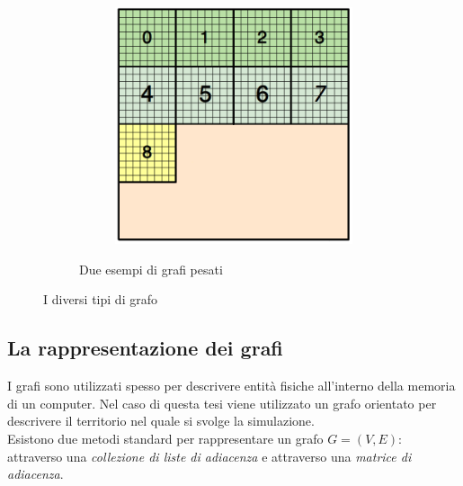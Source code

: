 \begin{figure}[H]
\begin{subfigure}{1.0\textwidth}
\begin{subfigure}{0.5\textwidth}
			\includegraphics[width=0.7\linewidth]{immagini/block_on_grid.png}
		\end{subfigure}
		\caption{Due esempi di grafi pesati}
		\label{fig:weighted_graph}
	\end{subfigure}
	\label{fig:graph_flavours}
	\caption{I diversi tipi di grafo}
\end{figure}


\subsection{La rappresentazione dei grafi}\label{subsec:graph_rappr}
I grafi sono utilizzati spesso per descrivere entità fisiche all'interno della memoria di un computer. Nel caso di questa tesi viene utilizzato un grafo orientato per descrivere il territorio nel quale si svolge la simulazione.\\
Esistono due metodi standard per rappresentare un grafo $G = (V, E)$: attraverso una \emph{collezione di liste di adiacenza} e attraverso una \emph{matrice di adiacenza}.

